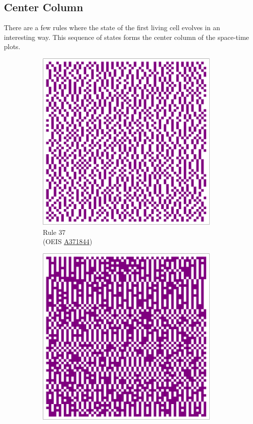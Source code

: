 \documentclass{article}
\begin{document}
\pagebreak
\subsection{Center Column} \label{center-column}
\noindent There are a few rules where the state of the first living cell evolves in an interesting way. This sequence of states forms the center column of the space-time plots.

\begin{figure}[H]
    \centering
    \begin{subfigure}[b]{0.24\textwidth}
        \centering
        \includegraphics[width=.9\textwidth]{graphics/behavior/center-columns/rule-37-center_column_plot-4096.pdf}
        \caption*{Rule 37\\(OEIS \href{https://oeis.org/A371844}{A371844})}
        \label{fig:rule-37-center_column_plot-4096}
    \end{subfigure}
    \begin{subfigure}[b]{0.24\textwidth}
        \centering
        \includegraphics[width=.9\textwidth]{graphics/behavior/center-columns/rule-61-center_column_plot-4096.pdf}

\end{subfigure}
\end{figure}
\end{document}
